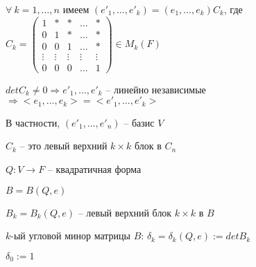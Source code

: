 $\forall \ k = 1, \dots, n$ имеем $(e'_1, \dots, e'_k) = (e_1, \dots, e_k) C_k$, где $C_k = \begin{pmatrix} 1 & * & * & \dots & * \\ 0 & 1 & * & \dots & * \\ 0 & 0 & 1 & \dots & * \\ \vdots & \vdots & \vdots & \vdots & \vdots \\ 0 & 0 & 0 & \dots & 1 \end{pmatrix} \in M_k(F)$

$det C_k \neq 0 \Rightarrow e'_1, \dots, e'_k$ -- линейно независимые $\Rightarrow <e_1, \dots, e_k> = <e'_1, \dots, e'_k>$

В частности, $(e'_1, \dots, e'_n)$ -- базис $V$

$C_k$ -- это левый верхний $k \times k$ блок в $C_n$

\vspace{\baselineskip}
$Q: V \rightarrow F$ -- квадратичная форма

$B = B(Q, e)$

$B_k = B_k(Q, e)$ -- левый верхний блок $k \times k$ в $B$

$k$-ый угловой минор матрицы $B$: $\delta_k = \delta_k(Q, e) := detB_k$

$\delta_0 := 1$

